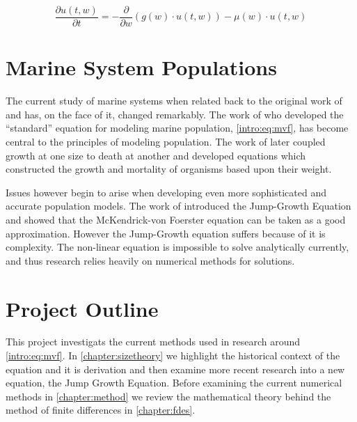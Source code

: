 \documentclass[../main]{subfiles}
\begin{document}
  \begin{equation} \label{intro:eq:mvf}
    \frac{\partial u(t, w)}{\partial t} = - \frac{\partial}{\partial w} \left(g(w) \cdot u(t, w) \right) - \mu(w) \cdot u(t, w)
  \end{equation}

  \section{Marine System Populations}
  The current study of marine systems when related back to the original work of \cite{mckendrick1926} and \cite{foerster1959} has, on the face of it, changed remarkably. The work of \cite{silvert1978} who developed the ``standard'' equation for modeling marine population, \autoref{intro:eq:mvf}, has become central to the principles of modeling population. The work of \cite{silvert1980} later coupled growth at one size to death at another and developed equations which constructed the growth and mortality of organisms based upon their weight.

  Issues however begin to arise when developing even more sophisticated and accurate population models. The work of \cite{datta2010} introduced the Jump-Growth Equation and showed that the McKendrick-von Foerster equation can be taken as a good approximation. However the Jump-Growth equation suffers because of it is complexity. The non-linear equation is impossible to solve analytically currently, and thus research relies heavily on numerical methods for solutions.

  \section{Project Outline}
  This project investigats the current methods used in research around \autoref{intro:eq:mvf}. In \autoref{chapter:sizetheory} we highlight the historical context of the equation and it is derivation and then examine more recent research into a new equation, the Jump Growth Equation. Before examining the current numerical methods in \autoref{chapter:method} we review the mathematical theory behind the method of finite differences in \autoref{chapter:fdes}. 
\end{document}
